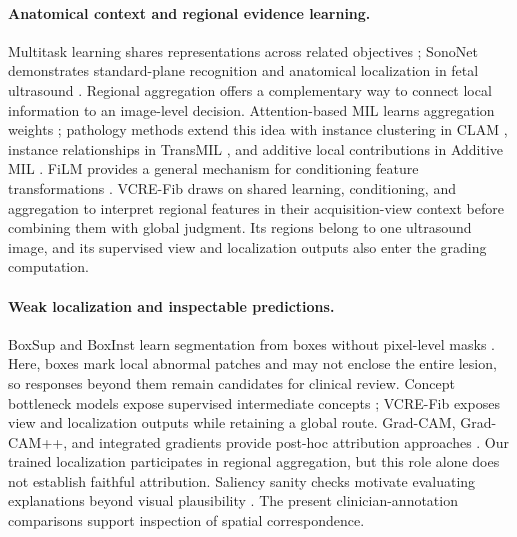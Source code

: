 \paragraph{Anatomical context and regional evidence learning.}
Multitask learning shares representations across related objectives \citep{caruana1997multitask}; SonoNet demonstrates standard-plane recognition and anatomical localization in fetal ultrasound \citep{baumgartner2017sononet}. Regional aggregation offers a complementary way to connect local information to an image-level decision. Attention-based MIL learns aggregation weights \citep{ilse2018attention}; pathology methods extend this idea with instance clustering in CLAM \citep{lu2021clam}, instance relationships in TransMIL \citep{shao2021transmil}, and additive local contributions in Additive MIL \citep{javed2022additive}. FiLM provides a general mechanism for conditioning feature transformations \citep{perez2018film}. VCRE-Fib draws on shared learning, conditioning, and aggregation to interpret regional features in their acquisition-view context before combining them with global judgment. Its regions belong to one ultrasound image, and its supervised view and localization outputs also enter the grading computation.

\paragraph{Weak localization and inspectable predictions.}
BoxSup and BoxInst learn segmentation from boxes without pixel-level masks \citep{dai2015boxsup,tian2021boxinst}. Here, boxes mark local abnormal patches and may not enclose the entire lesion, so responses beyond them remain candidates for clinical review. Concept bottleneck models expose supervised intermediate concepts \citep{koh2020concept}; VCRE-Fib exposes view and localization outputs while retaining a global route. Grad-CAM, Grad-CAM++, and integrated gradients provide post-hoc attribution approaches \citep{selvaraju2017gradcam,chattopadhay2018gradcampp,sundararajan2017axiomatic}. Our trained localization participates in regional aggregation, but this role alone does not establish faithful attribution. Saliency sanity checks motivate evaluating explanations beyond visual plausibility \citep{adebayo2018sanity}. The present clinician-annotation comparisons support inspection of spatial correspondence.

